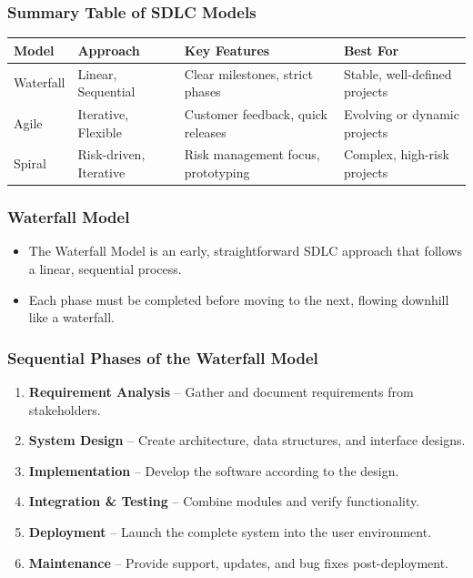 \documentclass{beamer}
\begin{document}
\begin{frame}[fragile]
  \frametitle{Summary Table of SDLC Models}
  \begin{tabular}{|l|l|l|l|}
    \hline
    \textbf{Model} & \textbf{Approach} & \textbf{Key Features} & \textbf{Best For} \\
    \hline
    Waterfall & Linear, Sequential & Clear milestones, strict phases & Stable, well-defined projects \\
    \hline
    Agile & Iterative, Flexible & Customer feedback, quick releases & Evolving or dynamic projects \\
    \hline
    Spiral & Risk-driven, Iterative & Risk management focus, prototyping & Complex, high-risk projects \\
    \hline
  \end{tabular}
\end{frame}

\begin{frame}[fragile]
    \frametitle{Waterfall Model}
    \begin{itemize}
        \item The Waterfall Model is an early, straightforward SDLC approach that follows a linear, sequential process.
        \item Each phase must be completed before moving to the next, flowing downhill like a waterfall.
    \end{itemize}
\end{frame}

\begin{frame}[fragile]
    \frametitle{Sequential Phases of the Waterfall Model}
    \begin{enumerate}
        \item \textbf{Requirement Analysis} -- Gather and document requirements from stakeholders.
        \item \textbf{System Design} -- Create architecture, data structures, and interface designs.
        \item \textbf{Implementation} -- Develop the software according to the design.
        \item \textbf{Integration \& Testing} -- Combine modules and verify functionality.
        \item \textbf{Deployment} -- Launch the complete system into the user environment.
        \item \textbf{Maintenance} -- Provide support, updates, and bug fixes post-deployment.
    \end{enumerate}
    \vspace{0.5cm}
\end{frame}
\end{document}
